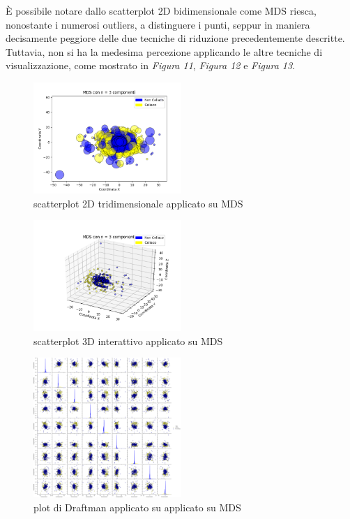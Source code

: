 \documentclass[11pt,a4paper,twocolumn]{article}
\begin{document}
	È possibile notare dallo scatterplot 2D bidimensionale come MDS riesca, nonostante i numerosi outliers, a distinguere i punti, seppur in maniera decisamente peggiore delle due tecniche di riduzione precedentemente descritte. Tuttavia, non si ha la medesima percezione applicando le altre tecniche di visualizzazione, come mostrato in \emph{Figura 11}, \emph{Figura 12} e \emph{Figura 13}.

	\begin{figure}[H]
		\centering
		\includegraphics[width=0.5\textwidth]{img/MDS_2Dnc3.png}
		\caption{scatterplot 2D tridimensionale applicato su MDS}
	\end{figure}

	\begin{figure}[H]
		\centering
		\includegraphics[width=0.5\textwidth]{img/MDS_i3D.png}
		\caption{scatterplot 3D interattivo applicato su MDS}
	\end{figure}

	\begin{figure}[H]
		\centering
		\includegraphics[width=0.5\textwidth]{img/MDS_SPLOM.png}
		\caption{plot di Draftman applicato su applicato su MDS}
	\end{figure}
\end{document}

